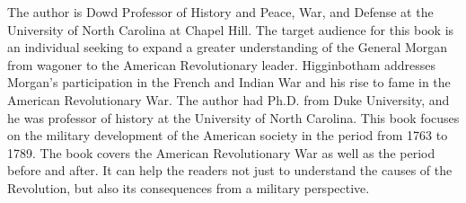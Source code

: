 The author is Dowd Professor of History and Peace, War, and Defense at
the University of North Carolina at Chapel Hill. The target audience for this
book is an individual seeking to expand a greater understanding of the General
Morgan from wagoner to the American Revolutionary leader. Higginbotham
addresses Morgan's participation in the French and Indian War and his rise to fame
in the American Revolutionary War.
The author had Ph.D. from Duke University, and he was professor of history at
the University of North Carolina. This book focuses on the military development
of the American society in the period from 1763 to 1789. The book covers the
American Revolutionary War as well as the period before and after. It can help
the readers not just to understand the causes of the Revolution, but also its
consequences from a military perspective.


